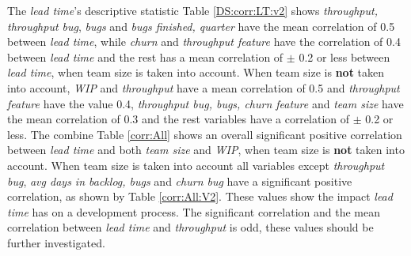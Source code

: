 \documentclass[UKenglish]{ifimaster}  %
\begin{document}


The \textit{lead time}'s descriptive statistic Table \ref{DS:corr:LT:v2} shows \textit{throughput, throughput bug}, \textit{bugs} and  \textit{bugs finished, quarter}  have the mean correlation of 0.5 between \textit{lead time}, while \textit{churn} and \textit{throughput feature} have the correlation of 0.4 between \textit{lead time} and the rest has a mean correlation of $\pm$ 0.2 or less between \textit{lead time}, when team size is taken into account. When team size is \textbf{not} taken into account, \textit{WIP} and \textit{throughput} have a mean correlation of 0.5 and \textit{throughput feature} have the value 0.4, \textit{throughput bug, bugs, churn feature} and \textit{team size} have the mean correlation of 0.3 and the rest variables have a correlation of $\pm$ 0.2 or less. The combine Table \ref{corr:All} shows an overall significant positive correlation between \textit{lead time} and both \textit{team size} and \textit{WIP}, when team size is \textbf{not} taken into account. When team size is taken into account all variables except \textit{throughput bug}, \textit{avg days in backlog, bugs} and \textit{churn bug} have a significant positive correlation, as shown by Table \ref{corr:All:V2}. These values show the impact \textit{lead time} has on a development process.  The significant correlation  and the mean correlation between \textit{lead time} and \textit{throughput} is odd, these values should be further investigated. 
\end{document}
